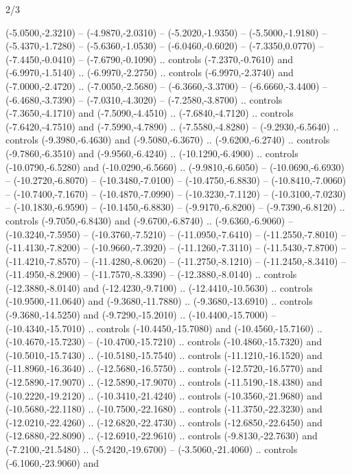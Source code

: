 \begin{flagdescription}{2/3}
\begin{scope}[xshift=0.5\flaglength,yshift=0.5\flagwidth,scale=\flagwidth/480]
\begin{scope}[y=0.80pt, x=0.80pt, yscale=-1,shift={(-450,-300)}]
  (-5.0500,-2.3210) -- (-4.9870,-2.0310) -- (-5.2020,-1.9350) --
  (-5.5000,-1.9180) -- (-5.4370,-1.7280) -- (-5.6360,-1.0530) --
  (-6.0460,-0.6020) -- (-7.3350,0.0770) -- (-7.4450,-0.0410) --
  (-7.6790,-0.1090) .. controls (-7.2370,-0.7610) and (-6.9970,-1.5140) ..
  (-6.9970,-2.2750) .. controls (-6.9970,-2.3740) and (-7.0000,-2.4720) ..
  (-7.0050,-2.5680) -- (-6.3660,-3.3700) -- (-6.6660,-3.4400) --
  (-6.4680,-3.7390) -- (-7.0310,-4.3020) -- (-7.2580,-3.8700) .. controls
  (-7.3650,-4.1710) and (-7.5090,-4.4510) .. (-7.6840,-4.7120) .. controls
  (-7.6420,-4.7510) and (-7.5990,-4.7890) .. (-7.5580,-4.8280) --
  (-9.2930,-6.5640) .. controls (-9.3980,-6.4630) and (-9.5080,-6.3670) ..
  (-9.6200,-6.2740) .. controls (-9.7860,-6.3510) and (-9.9560,-6.4240) ..
  (-10.1290,-6.4900) .. controls (-10.0790,-6.5280) and (-10.0290,-6.5660) ..
  (-9.9810,-6.6050) -- (-10.0690,-6.6930) -- (-10.2720,-6.8070) --
  (-10.3480,-7.0100) -- (-10.4750,-6.8830) -- (-10.8410,-7.0060) --
  (-10.7400,-7.1670) -- (-10.4870,-7.0990) -- (-10.3230,-7.1120) --
  (-10.3100,-7.0230) -- (-10.1830,-6.9590) -- (-10.1450,-6.8830) --
  (-9.9170,-6.8200) -- (-9.7390,-6.8120) .. controls (-9.7050,-6.8430) and
  (-9.6700,-6.8740) .. (-9.6360,-6.9060) -- (-10.3240,-7.5950) --
  (-10.3760,-7.5210) -- (-11.0950,-7.6410) -- (-11.2550,-7.8010) --
  (-11.4130,-7.8200) -- (-10.9660,-7.3920) -- (-11.1260,-7.3110) --
  (-11.5430,-7.8700) -- (-11.4210,-7.8570) -- (-11.4280,-8.0620) --
  (-11.2750,-8.1210) -- (-11.2450,-8.3410) -- (-11.4950,-8.2900) --
  (-11.7570,-8.3390) -- (-12.3880,-8.0140) .. controls (-12.3880,-8.0140) and
  (-12.4230,-9.7100) .. (-12.4410,-10.5630) .. controls (-10.9500,-11.0640) and
  (-9.3680,-11.7880) .. (-9.3680,-13.6910) .. controls (-9.3680,-14.5250) and
  (-9.7290,-15.2010) .. (-10.4400,-15.7000) -- (-10.4340,-15.7010) .. controls
  (-10.4450,-15.7080) and (-10.4560,-15.7160) .. (-10.4670,-15.7230) --
  (-10.4700,-15.7210) .. controls (-10.4860,-15.7320) and (-10.5010,-15.7430) ..
  (-10.5180,-15.7540) .. controls (-11.1210,-16.1520) and (-11.8960,-16.3640) ..
  (-12.5680,-16.5750) .. controls (-12.5720,-16.5770) and (-12.5890,-17.9070) ..
  (-12.5890,-17.9070) .. controls (-11.5190,-18.4380) and (-10.2220,-19.2120) ..
  (-10.3410,-21.4240) .. controls (-10.3560,-21.9680) and (-10.5680,-22.1180) ..
  (-10.7500,-22.1680) .. controls (-11.3750,-22.3230) and (-12.0210,-22.4260) ..
  (-12.6820,-22.4730) .. controls (-12.6850,-22.6450) and (-12.6880,-22.8090) ..
  (-12.6910,-22.9610) .. controls (-9.8130,-22.7630) and (-7.2100,-21.5480) ..
  (-5.2420,-19.6700) -- (-3.5060,-21.4060) .. controls (-6.1060,-23.9060) and

\end{scope}
\end{scope}
\end{flagdescription}
